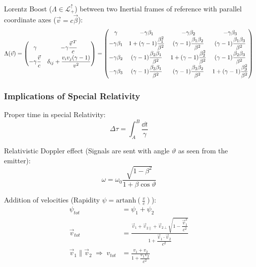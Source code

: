 			\noindent
			Lorentz Boost ($\Lambda\in\mathcal{L}^\uparrow_+$) between two Inertial frames of reference with parallel coordinate axes ($\vec{v}=c\vec{\beta}$):
			\begin{equation}
				\Lambda(\vec{v}) = \left( \begin{matrix}
					\gamma & -\gamma\dfrac{\pvec{v}^T}{c} \\[6pt]
					-\gamma\dfrac{\vec{v}}{c} & \delta_{ij}+\dfrac{v_i v_j(\gamma-1)}{v^2}
					\end{matrix} \right)
					=
					\left(\begin{matrix}
						\gamma & -\gamma \beta_1 & -\gamma \beta_2 & -\gamma \beta_3 \\
						-\gamma \beta_1 & 1+(\gamma -1){\dfrac {\beta_1^{2}}{\beta^{2}}} & (\gamma -1){\dfrac {\beta_1 \beta_2}{\beta^{2}}}&(\gamma -1){\dfrac {\beta_1\beta_3}{\beta^{2}}} \\
						-\gamma \beta_2 & (\gamma -1){\dfrac {\beta_2\beta_1}{\beta^{2}}} & 1+(\gamma -1){\dfrac {\beta_2^{2}}{\beta^{2}}}&(\gamma -1){\dfrac {\beta_2 \beta_3}{\beta^{2}}} \\
						-\gamma \beta_3 &(\gamma -1){\dfrac {\beta_3\beta_1}{\beta^{2}}}&(\gamma -1){\dfrac {\beta_3\beta_2}{\beta^{2}}}&1+(\gamma -1){\dfrac {\beta_3^{2}}{\beta^{2}}}
					\end{matrix}\right)
			\end{equation}

		\subsubsection{Implications of Special Relativity}
			\noindent
			Proper time in special Relativity:
			\begin{equation}
				\Delta\tau = \int_A^B \frac{\dd t}{\gamma}
			\end{equation}

			\noindent
			Relativistic Doppler effect (Signals are sent with angle $\vartheta$ as seen from the emitter):
			\begin{equation}
				\omega = \omega_0\frac{\sqrt{1-\beta^2}}{1+\beta\cos\vartheta}
			\end{equation}

			\noindent
			Addition of velocities (Rapidity $\psi = \mathrm{artanh}\left(\frac{v}{c}\right)$):
			\begin{equation}
				\begin{aligned}
					\psi_{tot} &= \psi_1+\psi_2 \\
					\vec{v}_{tot} &= \frac{\vec{v}_1+\vec{v}_{2\parallel}+\vec{v}_{2\perp}\sqrt{1-\dfrac{\vec{v}_1^2}{c^2}}}{1+\dfrac{\vec{v}_1\cdot\vec{v}_2}{c^2}} \\
					\vec{v}_1\parallel\vec{v}_2 \;\Rightarrow\; v_{tot} &= \frac{v_1+v_2}{1+\dfrac{v_1 v_2}{c^2}}
				\end{aligned}
			\end{equation}

